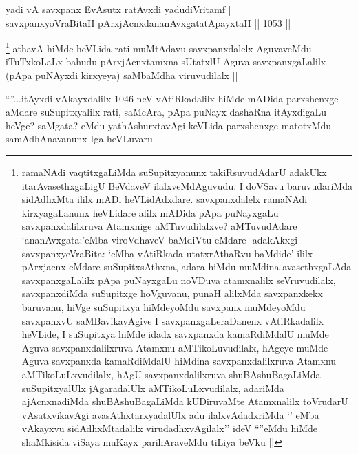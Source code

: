 
\begin{shl}
yadi vA savxpanx EvAsutx ratAvxdi yadudiVritamf | \\
savxpanxyoVraBitaH pArxjAcnxdananAvxgatatA\s payxtaH  \hfill||  1053 ||  
\end{shl}

\begin{artha}
\footnote{ramaNAdi vaqtitxgaLiMda suSupitxyanunx takiRsuvudAdarU adakUkx itarAvasethxgaLigU BeVdaveV ilalxveMdAguvudu. I doVSavu baruvudariMda sidAdhxMta ililx mADi heVLidAdxdare. savxpanxdalelx ramaNAdi kirxyagaLanunx heVLidare alilx mADida pApa puNayxgaLu savxpanxdalilxruva Atamxnige aMTuvudilalxve? aMTuvudAdare `ananAvxgata:'eMba viroVdhaveV baMdiVtu eMdare- adakAkxgi savxpanxyeVraBita: `eMba vAtiRkada utatxrAthaRvu baMdide' ililx pArxjacnx eMdare suSupitxsAthxna, adara hiMdu muMdina avasethxgaLAda savxpanxgaLalilx pApa puNayxgaLu noVDuva atamxnalilx seVruvudilalx, savxpanxdiMda suSupitxge hoVguvanu, punaH alilxMda savxpanxkekx baruvanu, hiVge suSupitxya hiMdeyoMdu savxpanx muMdeyoMdu savxpanxvU saMBavikavAgive I savxpanxgaLeraDanenx vAtiRkadalilx heVLide, I suSupitxya hiMde idadx savxpanxda kamaRdiMdalU muMde Aguva savxpanxdalilxruva Atamxnu aMTikoLuvudilalx, hAgeye muMde Aguva savxpanxda kamaRdiMdalU hiMdina savxpanxdalilxruva Atamxnu aMTikoLuLxvudilalx, hAgU savxpanxdalilxruva shuBAshuBagaLiMda suSupitxyalUlx jAgaradalUlx aMTikoLuLxvudilalx, adariMda ajAcnxnadiMda shuBAshuBagaLiMda kUDiruvaMte Atamxnalilx toVrudarU vAsatxvikavAgi avasAthxtarxyadalUlx adu ilalxvAdadxriMda `\stext' eMba vAkayxvu sidAdhxMtadalilx virudadhxvAgilalx'' ideV ``\stext''eMdu hiMde shaMkisida viSaya muKayx parihAraveMdu tiLiya beVku ||}
athavA hiMde heVLida rati muMtAdavu savxpanxdalelx AguvaveMdu iTuTxkoLaLx bahudu pArxjAcnxtamxna sUtatxlU Aguva savxpanxgaLalilx (pApa puNAyxdi kirxyeya) saMbaMdha viruvudilalx ||
\end{artha}

\begin{artha}
``\stext''...itAyxdi vAkayxdalilx 1046 neV vAtiRkadalilx hiMde mADida parxshenxge aMdare suSupitxyalilx rati, saMcAra, pApa puNayx dashaRna itAyxdigaLu heVge? saMgata? eMdu yathAshurxtavAgi keVLida parxshenxge matotxMdu samAdhAnavanunx Iga heVLuvaru-
\end{artha}


